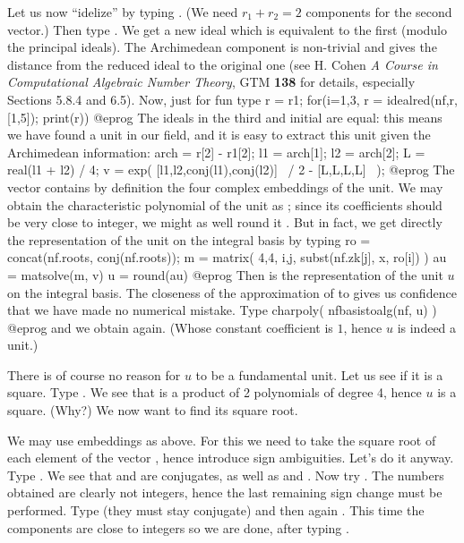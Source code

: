 Let us now ``idelize''  by typing .
(We need $r_1+r_2=2$ components for the second vector.) Then type
. We get a new ideal which is equivalent to the
first (modulo the principal ideals). The Archimedean component is non-trivial
and gives the distance from the reduced ideal to the original one (see H. Cohen
\emph{A Course in Computational Algebraic Number Theory}, GTM {\bf 138} for
details, especially Sections 5.8.4 and 6.5). Now, just for fun type
\bprog
  r = r1; for(i=1,3, r = idealred(nf,r,[1,5]); print(r))
@eprog\noindent
The ideals in the third  and initial  are equal: this means we
have found a unit in our field, and it is easy to extract this unit given the
Archimedean information:
\bprog
  arch = r[2] - r1[2]; l1 = arch[1]; l2 = arch[2];
  L = real(l1 + l2) / 4;
  v = exp( [l1,l2,conj(l1),conj(l2)]~ / 2 - [L,L,L,L]~ );
@eprog\noindent
The vector  contains by definition the four complex embeddings of the
unit. We may obtain the characteristic polynomial of the unit as
; since its coefficients should be very close
to integer, we might as well round it . But in fact, we
get directly the representation of the unit on the integral basis by typing
\bprog
  ro = concat(nf.roots, conj(nf.roots));
  m = matrix( 4,4, i,j, subst(nf.zk[j], x, ro[i]) )
  au = matsolve(m, v)
  u = round(au)
@eprog\noindent
Then  is the representation of the unit $u$ on the integral basis. The
closeness of the approximation of  to  gives us confidence
that we have made no numerical mistake. Type
\bprog
charpoly( nfbasistoalg(nf, u) )
@eprog\noindent
and we obtain  again. (Whose constant coefficient is $1$, hence
$u$ is indeed a unit.)

There is of course no reason for $u$ to be a fundamental unit. Let us see if
it is a square. Type . We see that
 is a product of 2 polynomials of degree 4, hence $u$ is
a square. (Why?) We now want to find its square root.

We may use embeddings as above. For this we need to take the square root of
each element of the vector , hence introduce sign ambiguities. Let's
do it anyway. Type . We see that  and 
are conjugates, as well as  and . Now try
. The numbers obtained are clearly not integers, hence the
last remaining sign change must be performed. Type  (they must stay conjugate) and then again . This
time the components are close to integers so we are done, after typing
.

